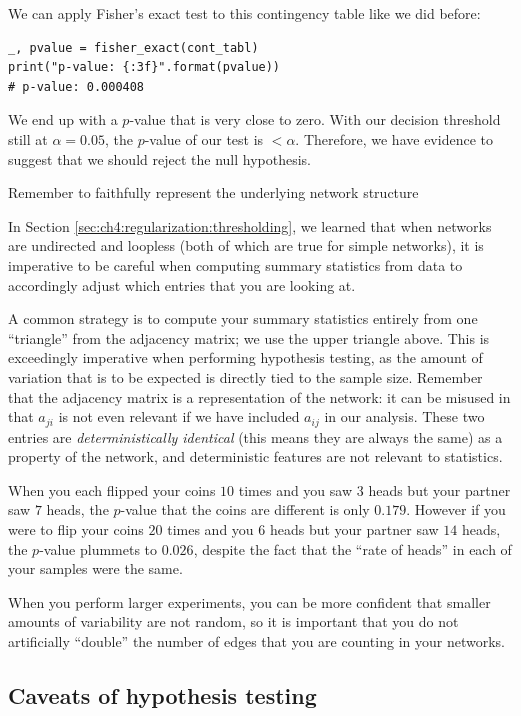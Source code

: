 We can apply Fisher's exact test to this contingency table like we did before:

\begin{lstlisting}[style=python]
_, pvalue = fisher_exact(cont_tabl)
print("p-value: {:3f}".format(pvalue))
# p-value: 0.000408
\end{lstlisting}
We end up with a $p$-value that is very close to zero. With our decision threshold still at $\alpha = 0.05$, the $p$-value of our test is $< \alpha$. Therefore, we have evidence to suggest that we should reject the null hypothesis.


\begin{floatingbox}[h]\caption{Remember to faithfully represent the underlying network structure}
\label{box:ch7:testing:faithful}
In Section \ref{sec:ch4:regularization:thresholding}, we learned that when networks are undirected and loopless (both of which are true for simple networks), it is imperative to be careful when computing summary statistics from data to accordingly adjust which entries that you are looking at.

A common strategy is to compute your summary statistics entirely from one ``triangle'' from the adjacency matrix; we use the upper triangle above. This is exceedingly imperative when performing hypothesis testing, as the amount of variation that is to be expected is directly tied to the sample size. Remember that the adjacency matrix is a representation of the network: it can be misused in that $a_{ji}$ is not even relevant if we have included $a_{ij}$ in our analysis. These two entries are \textit{deterministically identical} (this means they are always the same) as a property of the network, and deterministic features are not relevant to statistics.

When you each flipped your coins $10$ times and you saw $3$ heads but your partner saw $7$ heads, the $p$-value that the coins are different is only $0.179$. However if you were to flip your coins $20$ times and you $6$ heads but your partner saw $14$ heads, the $p$-value plummets to $0.026$, despite the fact that the ``rate of heads'' in each of your samples were the same. 

When you perform larger experiments, you can be more confident that smaller amounts of variability are not random, so it is important that you do not artificially ``double'' the number of edges that you are counting in your networks.
\end{floatingbox}


\subsection{Caveats of hypothesis testing}

